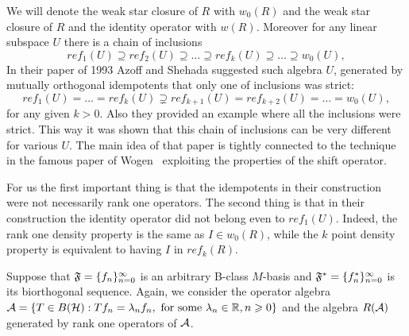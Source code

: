 \documentclass[12pt]{amsart}
\theoremstyle{case}
\begin{document}
  We will denote the weak star closure of $R$ with $w_0(R)$ and the weak star closure of $R$ and the identity operator with $w(R)$.
  Moreover for any linear subspace $U$ there is a chain of inclusions
  \[
    ref_1(U) \supseteq ref_2(U) \supseteq \dots \supseteq ref_k(U) \supseteq \dots \supseteq w_0(U),
  \]
  In their paper \cite{azoff2} of 1993 Azoff and Shehada suggested such algebra $U$, generated by
    mutually orthogonal idempotents that only one of inclusions was strict:
  \[
    ref_1(U) = \dots = ref_k(U) \supsetneq ref_{k + 1}(U) = ref_{k+2}(U) = \dots = w_0(U),
  \]
    for any given $k > 0$.
  Also they provided an example where all the inclusions were strict.
  This way it was shown that this chain of inclusions can be very different for various $U$.
  The main idea of that paper is tightly connected to the technique in the famous paper of Wogen~\cite{wogen}
    exploiting the properties of the shift operator.

  For us the first important thing is that the idempotents in their construction were not necessarily rank one operators.
  The second thing is that in their construction the identity operator did not belong even to $ref_1(U)$.
  Indeed, the rank one density property is the same as $I \in w_0(R)$,
    while the $k$ point density property is equivalent to having $I$ in $ref_k(R)$.

  Suppose that $\fsys=\{f_n\}_{n=0}^\infty$ is an arbitrary B-class $M$-basis and
    $\fstarsys = \{f^*_n\}_{n=0}^\infty$ is its biorthogonal sequence.
  Again, we consider the operator algebra $\cal{A} = \{T\in B(\cal{H}): Tf_n = \lambda_n f_n,
    \text{ for some } \lambda_n \in \mathbb{R}, n \geq 0\}$
    and the algebra $R(\cal{A})$ generated by rank one operators of $\cal{A}$.
\end{document}
